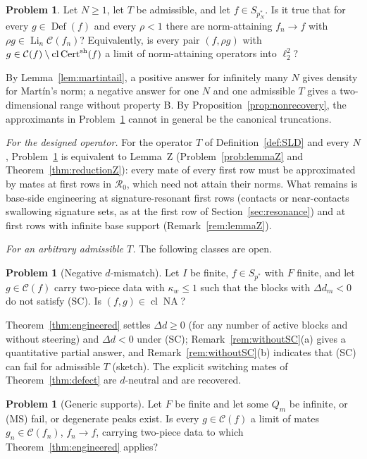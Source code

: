 \documentclass[10pt]{amsart}
\theoremstyle{definition}
\newtheorem{problem}[theorem]{Problem}
\theoremstyle{remark}
\newcommand{\NA}{\operatorname{NA}}
\newcommand{\Cset}{\mathcal C}
\newcommand{\Cert}{\operatorname{Cert}}
\newcommand{\Li}{\operatorname*{Li}}
\newcommand{\cl}{\operatorname{cl}}
\newcommand{\Def}{\operatorname{Def}}
\begin{document}
\begin{problem}\label{prob:main}
Let $N\ge1$, let $T$ be admissible, and let $f\in S_{p_N^*}$.  Is it true
that for every $g\in\Def(f)$ and every $\rho<1$ there are norm-attaining
$f_n\to f$ with $\rho g\in\Li_n\Cset(f_n)$?  Equivalently, is every pair
$(f,\rho g)$ with $g\in\Cset(f)\setminus\cl\Cert^{\rm sh}(f)$ a limit of
norm-attaining operators into $\ell_2^2$?
\end{problem}

By Lemma~\ref{lem:martintail}, a positive answer for infinitely many $N$
gives density for Mart\'in's norm; a negative answer for one $N$ and one
admissible $T$ gives a two-dimensional range without property B.  By
Proposition~\ref{prop:nonrecovery}, the approximants in
Problem~\ref{prob:main} cannot in general be the canonical truncations.

\emph{For the designed operator.}  For the operator $T$ of
Definition~\ref{def:SLD} and every $N$, Problem~\ref{prob:main} is
equivalent to Lemma~Z (Problem~\ref{prob:lemmaZ} and
Theorem~\ref{thm:reductionZ}): every mate of every first row must be
approximated by mates at first rows in $\mathcal R_0$, which need not attain
their norms.  What remains is base-side engineering at signature-resonant
first rows (contacts or near-contacts swallowing signature sets, as at the
first row of Section~\ref{sec:resonance}) and at first rows with infinite
base support (Remark~\ref{rem:lemmaZ}).

\emph{For an arbitrary admissible $T$.}  The following classes are open.

\begin{problem}[Negative $d$-mismatch]\label{prob:resonant}
Let $I$ be finite, $f\in S_{p^*}$ with $F$ finite, and let $g\in\Cset(f)$
carry two-piece data with $\kappa_w\le1$ such that the blocks with
$\Delta d_m<0$ do not satisfy \textup{(SC)}.  Is $(f,g)\in\cl\NA$?
\end{problem}

Theorem~\ref{thm:engineered} settles $\Delta d\ge0$ (for any number of
active blocks and without steering) and $\Delta d<0$ under \textup{(SC)};
Remark~\ref{rem:withoutSC}(a) gives a quantitative partial answer, and
Remark~\ref{rem:withoutSC}(b) indicates that \textup{(SC)} can fail for
admissible $T$ (sketch).  The explicit switching mates of
Theorem~\ref{thm:defect} are $d$-neutral and are recovered.

\begin{problem}[Generic supports]\label{prob:generic}
Let $F$ be finite and let some $Q_m$ be infinite, or \textup{(MS)} fail, or
degenerate peaks exist.  Is every $g\in\Cset(f)$ a limit of mates
$g_n\in\Cset(f_n)$, $f_n\to f$, carrying two-piece data to which
Theorem~\ref{thm:engineered} applies?
\end{problem}
\end{document}
